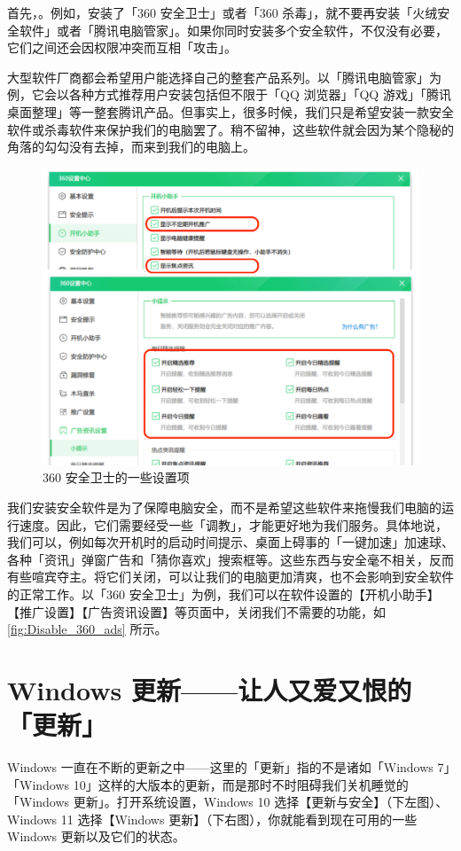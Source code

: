 首先，。例如，安装了「360 安全卫士」或者「360 杀毒」，就不要再安装「火绒安全软件」或者「腾讯电脑管家」。如果你同时安装多个安全软件，不仅没有必要，它们之间还会因权限冲突而互相「攻击」。

大型软件厂商都会希望用户能选择自己的整套产品系列。以「腾讯电脑管家」为例，它会以各种方式推荐用户安装包括但不限于「QQ 浏览器」「QQ 游戏」「腾讯桌面整理」等一整套腾讯产品。但事实上，很多时候，我们只是希望安装一款安全软件或杀毒软件来保护我们的电脑罢了。稍不留神，这些软件就会因为某个隐秘的角落的勾勾没有去掉，而来到我们的电脑上。

\begin{figure}[htb!]
  \centering
  \includegraphics[width=.64\textwidth]{assets/basic/Disable_360_ads.png}
  \caption{360 安全卫士的一些设置项}
  \label{fig:Disable_360_ads}
\end{figure}

我们安装安全软件是为了保障电脑安全，而不是希望这些软件来拖慢我们电脑的运行速度。因此，它们需要经受一些「调教」，才能更好地为我们服务。具体地说，我们可以，例如每次开机时的启动时间提示、桌面上碍事的「一键加速」加速球、各种「资讯」弹窗广告和「猜你喜欢」搜索框等。这些东西与安全毫不相关，反而有些喧宾夺主。将它们关闭，可以让我们的电脑更加清爽，也不会影响到安全软件的正常工作。以「360 安全卫士」为例，我们可以在软件设置的【开机小助手】【推广设置】【广告资讯设置】等页面中，关闭我们不需要的功能，如\autoref{fig:Disable_360_ads} 所示。

\section{Windows 更新——让人又爱又恨的「更新」}

Windows 一直在不断的更新之中——这里的「更新」指的不是诸如「Windows 7」「Windows 10」这样的大版本的更新，而是那时不时阻碍我们关机睡觉的「Windows 更新」。打开系统设置，Windows 10 选择【更新与安全】（下左图）、Windows 11 选择【Windows 更新】（下右图），你就能看到现在可用的一些 Windows 更新以及它们的状态。

